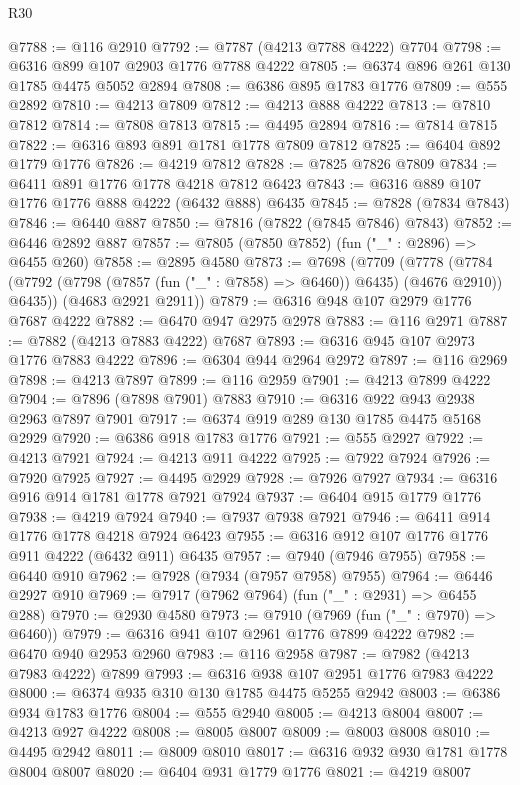 \begin{lexlean}{R30}
\begin{coremodule}
{{{{{@7788 := @116 @2910
@7792 := @7787 (@4213 @7788 @4222) @7704
@7798 := @6316 @899 @107 @2903 @1776 @7788 @4222
@7805 := @6374 @896 @261 @130 @1785 @4475 @5052 @2894
@7808 := @6386 @895 @1783 @1776
@7809 := @555 @2892
@7810 := @4213 @7809
@7812 := @4213 @888 @4222
@7813 := @7810 @7812
@7814 := @7808 @7813
@7815 := @4495 @2894
@7816 := @7814 @7815
@7822 := @6316 @893 @891 @1781 @1778 @7809 @7812
@7825 := @6404 @892 @1779 @1776
@7826 := @4219 @7812
@7828 := @7825 @7826 @7809
@7834 := @6411 @891 @1776 @1778 @4218 @7812 @6423
@7843 := @6316 @889 @107 @1776 @1776 @888 @4222 (@6432 @888) @6435
@7845 := @7828 (@7834 @7843)
@7846 := @6440 @887
@7850 := @7816 (@7822 (@7845 @7846) @7843)
@7852 := @6446 @2892 @887
@7857 := @7805 (@7850 @7852) (fun ("_" : @2896) => @6455 @260)
@7858 := @2895 @4580
@7873 := @7698
    (@7709
      (@7778 (@7784 (@7792 (@7798 (@7857 (fun ("_" : @7858) => @6460)) @6435) (@4676 @2910)) @6435))
      (@4683 @2921 @2911))
@7879 := @6316 @948 @107 @2979 @1776 @7687 @4222
@7882 := @6470 @947 @2975 @2978
@7883 := @116 @2971
@7887 := @7882 (@4213 @7883 @4222) @7687
@7893 := @6316 @945 @107 @2973 @1776 @7883 @4222
@7896 := @6304 @944 @2964 @2972
@7897 := @116 @2969
@7898 := @4213 @7897
@7899 := @116 @2959
@7901 := @4213 @7899 @4222
@7904 := @7896 (@7898 @7901) @7883
@7910 := @6316 @922 @943 @2938 @2963 @7897 @7901
@7917 := @6374 @919 @289 @130 @1785 @4475 @5168 @2929
@7920 := @6386 @918 @1783 @1776
@7921 := @555 @2927
@7922 := @4213 @7921
@7924 := @4213 @911 @4222
@7925 := @7922 @7924
@7926 := @7920 @7925
@7927 := @4495 @2929
@7928 := @7926 @7927
@7934 := @6316 @916 @914 @1781 @1778 @7921 @7924
@7937 := @6404 @915 @1779 @1776
@7938 := @4219 @7924
@7940 := @7937 @7938 @7921
@7946 := @6411 @914 @1776 @1778 @4218 @7924 @6423
@7955 := @6316 @912 @107 @1776 @1776 @911 @4222 (@6432 @911) @6435
@7957 := @7940 (@7946 @7955)
@7958 := @6440 @910
@7962 := @7928 (@7934 (@7957 @7958) @7955)
@7964 := @6446 @2927 @910
@7969 := @7917 (@7962 @7964) (fun ("_" : @2931) => @6455 @288)
@7970 := @2930 @4580
@7973 := @7910 (@7969 (fun ("_" : @7970) => @6460))
@7979 := @6316 @941 @107 @2961 @1776 @7899 @4222
@7982 := @6470 @940 @2953 @2960
@7983 := @116 @2958
@7987 := @7982 (@4213 @7983 @4222) @7899
@7993 := @6316 @938 @107 @2951 @1776 @7983 @4222
@8000 := @6374 @935 @310 @130 @1785 @4475 @5255 @2942
@8003 := @6386 @934 @1783 @1776
@8004 := @555 @2940
@8005 := @4213 @8004
@8007 := @4213 @927 @4222
@8008 := @8005 @8007
@8009 := @8003 @8008
@8010 := @4495 @2942
@8011 := @8009 @8010
@8017 := @6316 @932 @930 @1781 @1778 @8004 @8007
@8020 := @6404 @931 @1779 @1776
@8021 := @4219 @8007
}}}}}
\end{coremodule}
\end{lexlean}
